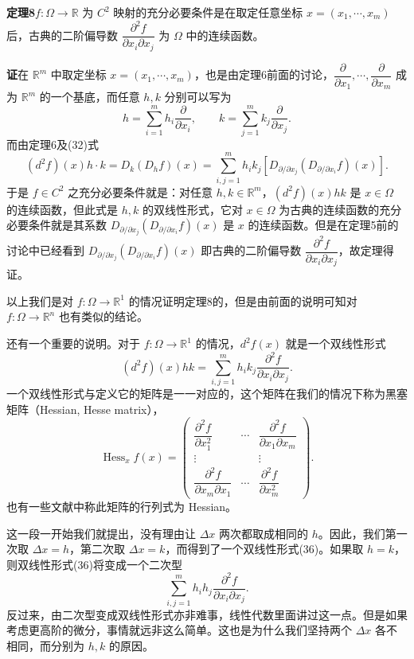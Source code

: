 \noindent\textbf{定理8}\quad $f:\Omega\to\mathbb R$ 为 $C^2$ 映射的充分必要条件是在取定任意坐标 $x=(x_1,\cdots,x_m)$ 后，古典的二阶偏导数 $\dfrac{\partial^2f}{\partial x_i\partial x_j}$ 为 $\Omega$ 中的连续函数。

\noindent\textbf{证}\quad 在 $\mathbb R^m$ 中取定坐标 $x=(x_1,\cdots,x_m)$，也是由定理6前面的讨论，$\dfrac{\partial}{\partial x_1},\cdots,\dfrac{\partial}{\partial x_m}$ 成为 $\mathbb R^m$ 的一个基底，而任意 $h,k$ 分别可以写为
\[
 h=\sum_{i=1}^m h_i\frac{\partial}{\partial x_i},\qquad
 k=\sum_{j=1}^m k_j\frac{\partial}{\partial x_j}.
\]
而由定理6及(32)式
\[
 (d^2f)(x)h\cdot k=D_k(D_hf)(x)
 =\sum_{i,j=1}^m h_i k_j\left[D_{\partial/\partial x_j}\left(D_{\partial/\partial x_i}f\right)(x)\right].
\]
于是 $f\in C^2$ 之充分必要条件就是：对任意 $h,k\in\mathbb R^m$，$(d^2f)(x)hk$ 是 $x\in\Omega$ 的连续函数，但此式是 $h,k$ 的双线性形式，它对 $x\in\Omega$ 为古典的连续函数的充分必要条件就是其系数 $D_{\partial/\partial x_j}(D_{\partial/\partial x_i}f)(x)$ 是 $x$ 的连续函数。但是在定理5前的讨论中已经看到 $D_{\partial/\partial x_j}(D_{\partial/\partial x_i}f)(x)$ 即古典的二阶偏导数 $\dfrac{\partial^2f}{\partial x_i\partial x_j}$，故定理得证。

以上我们是对 $f:\Omega\to\mathbb R^1$ 的情况证明定理8的，但是由前面的说明可知对 $f:\Omega\to\mathbb R^n$ 也有类似的结论。

还有一个重要的说明。对于 $f:\Omega\to\mathbb R^1$ 的情况，$d^2f(x)$ 就是一个双线性形式
\begin{equation}
 (d^2f)(x)hk=\sum_{i,j=1}^m h_i k_j\frac{\partial^2f}{\partial x_i\partial x_j}.
 \tag{36}
\end{equation}
一个双线性形式与定义它的矩阵是一一对应的，这个矩阵在我们的情况下称为黑塞矩阵（Hessian, Hesse matrix），
\begin{equation}
 \operatorname{Hess}_x f(x)=
 \begin{pmatrix}
 \dfrac{\partial^2f}{\partial x_1^2}&\cdots&\dfrac{\partial^2f}{\partial x_1\partial x_m}\\
 \vdots&&\vdots\\
 \dfrac{\partial^2f}{\partial x_m\partial x_1}&\cdots&\dfrac{\partial^2f}{\partial x_m^2}
 \end{pmatrix}.
 \tag{37}
\end{equation}
也有一些文献中称此矩阵的行列式为 Hessian。

这一段一开始我们就提出，没有理由让 $\Delta x$ 两次都取成相同的 $h$。因此，我们第一次取 $\Delta x=h$，第二次取 $\Delta x=k$，而得到了一个双线性形式(36)。如果取 $h=k$，则双线性形式(36)将变成一个二次型
\[
 \sum_{i,j=1}^m h_i h_j\frac{\partial^2f}{\partial x_i\partial x_j}.
\]
反过来，由二次型变成双线性形式亦非难事，线性代数里面讲过这一点。但是如果考虑更高阶的微分，事情就远非这么简单。这也是为什么我们坚持两个 $\Delta x$ 各不相同，而分别为 $h,k$ 的原因。

